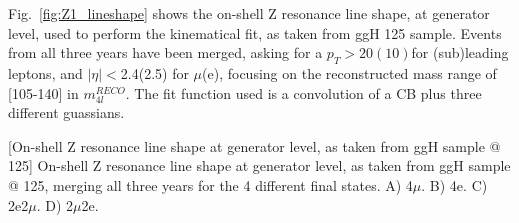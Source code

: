 Fig.~\ref{fig:Z1_lineshape} shows the on-shell Z resonance line shape, at generator level, 
used to perform the kinematical fit, as taken from ggH 125 \GeV sample. 
Events from all three years have been merged, asking for a 
$p_T > 20(10)$\GeV for (sub)leading leptons, and $|\eta|<$2.4(2.5) for $\mu$(e), focusing on
the reconstructed mass range of [105-140] \GeV in $m_{4l}^{RECO}$. The fit function used is a convolution
of a CB plus three different guassians.
\begin{multiFigure}
    \centering
        [On-shell Z resonance line shape at generator level, as taken from ggH sample @ 125\GeV]
        {On-shell Z resonance line shape at generator level, as taken from ggH sample @ 125\GeV, %
        merging all three years for the 4 different final states.
        \;A) 4$\mu$.
        \;B) 4e.
        \;C) 2e2$\mu$.
        \;D) 2$\mu$2e.
        }
    \label{fig:Z1_lineshape}
\end{multiFigure}
